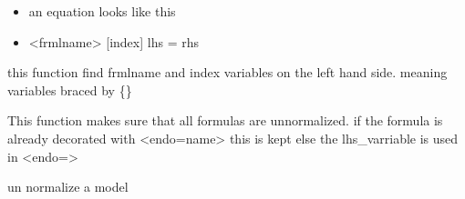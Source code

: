 \documentclass[letterpaper,10pt,english]{sphinxmanual}
\begin{document}

\begin{fulllineitems}
\label{\detokenize{index:modelmanipulation.findindex_gams}}
\pysigstartsignatures
{}
\pysigstopsignatures\begin{itemize}
\item {} 
\sphinxAtStartPar
an equation looks like this

\item {} 
\sphinxAtStartPar
\textless{}frmlname\textgreater{} {[}index{]} lhs = rhs

\end{itemize}

\sphinxAtStartPar
this function find frmlname and index variables on the left hand side. meaning variables braced by \{\}

\end{fulllineitems}


\begin{fulllineitems}
\label{\detokenize{index:modelmanipulation.un_normalize_expression}}
\pysigstartsignatures
{}
\pysigstopsignatures
\sphinxAtStartPar
This function makes sure that all formulas are unnormalized.
if the formula is already decorated with \textless{}endo=name\textgreater{} this is kept
else the lhs\_varriable is used in \textless{}endo=\textgreater{}

\end{fulllineitems}


\begin{fulllineitems}
\label{\detokenize{index:modelmanipulation.un_normalize_model}}
\pysigstartsignatures
{}
\pysigstopsignatures
\sphinxAtStartPar
un normalize a model

\end{fulllineitems}
\end{document}
